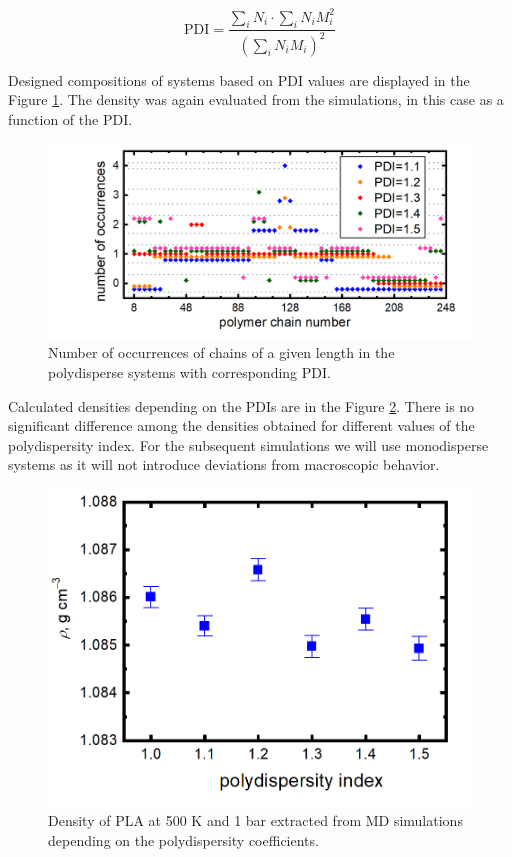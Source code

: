 \begin{equation}
	\text{PDI} = \frac{\sum_{i} N_{i} \cdot \sum_{i} N_{i} M_{i}^2}{\left(\sum_{i} N_{i} M_{i}\right)^2}
	\label{eq:PDI}
\end{equation}

Designed compositions of systems based on PDI values are displayed in the Figure \ref{fig:polydisperzita_vyskyt}. The density was again evaluated from the simulations, in this case as a function of the PDI.

\begin{figure}[htb]
	\centering
	\includegraphics[width=1\hsize]{img/polydispersity_occurences_new.png}
	\caption{Number of occurrences of chains of a given length in the polydisperse systems with corresponding PDI.}
	\label{fig:polydisperzita_vyskyt}
\end{figure}       

Calculated densities depending on the PDIs are in the Figure \ref{fig:polydisperzita}. There is no significant difference among the densities obtained for different values of the polydispersity index. For the subsequent simulations we will use monodisperse systems as it will not introduce deviations from macroscopic behavior. 

\begin{figure}[htb]
	\centering
	\includegraphics[width=0.5\hsize]{img/polydisperzita_new.png}
	\caption{Density of PLA at 500 K and 1 bar extracted from MD simulations depending on the polydispersity coefficients.}
	\label{fig:polydisperzita}
\end{figure}       

